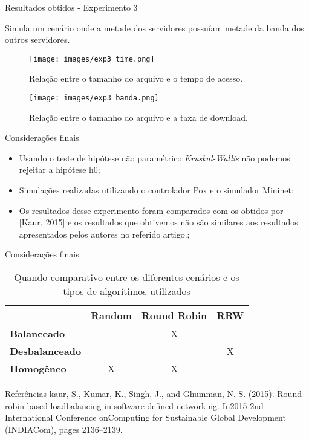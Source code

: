 \documentclass{beamer}
\begin{document}
\begin{frame}{Resultados obtidos - Experimento 3}

    Simula um cenário onde a metade dos servidores possuíam metade da banda dos outros servidores. 

    \begin{figure}[ht]
        \begin{minipage}[b]{0.45\linewidth}
            \centering
            \texttt{[image: images/exp3\_time.png]}
            \caption{Relação entre o tamanho do arquivo e o tempo de acesso.}
            \label{fig:a}
        \end{minipage}
        \hspace{0.5cm}
        \begin{minipage}[b]{0.45\linewidth}
            \centering
            \texttt{[image: images/exp3\_banda.png]}
            \caption{Relação entre o tamanho do arquivo e a taxa de download.}
            \label{fig:b}
        \end{minipage}
    \end{figure}
\end{frame}  

\begin{frame}{Considerações finais}
    \begin{itemize}  
        \item  Usando o teste de hipótese não paramétrico \textit{Kruskal-Wallis} não podemos rejeitar a hipótese h0;
        \item Simulações realizadas utilizando o controlador Pox e o simulador Mininet;
        \item Os resultados desse experimento foram comparados com os obtidos por [Kaur, 2015] e os resultados que obtivemos não são similares aos resultados apresentados pelos autores no referido artigo.;
    \end{itemize}
    
\end{frame}  


\begin{frame}{Considerações finais}

\begin{table}[h]
\centering
\caption{Quando comparativo entre os diferentes cenários e os tipos de algorítimos utilizados}
\label{quadro_comparativo}
\begin{tabular}{lccc}
 & \multicolumn{1}{l}{\textbf{Random}} & \multicolumn{1}{l}{\textbf{Round Robin}} & \multicolumn{1}{l}{\textbf{RRW}} \\\hline
\textbf{Balanceado} &  & X &  \\
\textbf{Desbalanceado} &  &  & X \\
\textbf{Homogêneo} & X & X & 
\end{tabular}
\end{table}
    
\end{frame}  

\begin{frame}{Referências}
    kaur, S., Kumar, K., Singh, J., and Ghumman, N. S. (2015).   Round-robin based loadbalancing in software defined networking.  In2015 2nd International Conference onComputing for Sustainable Global Development (INDIACom), pages 2136–2139.

\end{frame}  
\end{document}
